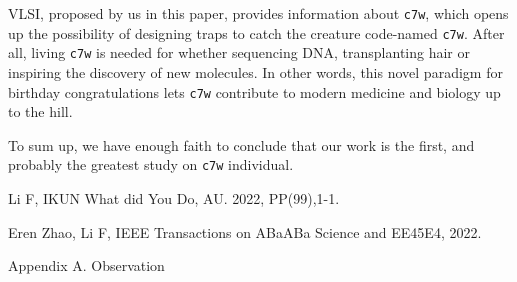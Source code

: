 \documentclass[10pt,twocolumn,letterpaper]{article}
\begin{document}
VLSI, proposed by us in this paper, provides information about \verb|c7w|, which opens up the possibility of designing traps to catch the creature code-named \verb|c7w|. After all, living \verb|c7w| is needed for whether sequencing DNA, transplanting hair or inspiring the discovery of new molecules. In other words, this novel paradigm for birthday congratulations lets \verb|c7w| contribute to modern medicine and biology up to the hill. 

To sum up, we have enough faith to conclude that our work is the first, and probably the greatest study on \verb|c7w| individual.

\begin{thebibliography}{}

 Li F,  IKUN What did You Do, AU. 2022, PP(99),1-1.

 Eren Zhao, Li F,   IEEE Transactions on ABaABa Science and EE45E4, 2022.

\end{thebibliography}{}
\vspace{20pt}
\Large{Appendix A. Observation}
\end{document}
